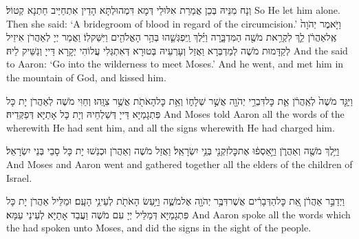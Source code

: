{וְנָח מִנֵּיהּ בְּכֵן אֲמַרַת אִלּוּלֵי דְּמָא דִּמְהוּלְתָּא הָדֵין אִתְחַיַּיב חַתְנָא קְטוֹל׃}
{So He let him alone. Then she said: ‘A bridegroom of blood in regard of the circumcision.’}{}
{וַיֹּ֤אמֶר יְהֹוָה֙ אֶֽל\maqqaf אַהֲרֹ֔ן לֵ֛ךְ לִקְרַ֥את מֹשֶׁ֖ה הַמִּדְבָּ֑רָה וַיֵּ֗לֶךְ וַֽיִּפְגְּשֵׁ֛הוּ בְּהַ֥ר הָאֱלֹהִ֖ים וַיִּשַּׁק\maqqaf לֽוֹ׃}
{וַאֲמַר יְיָ לְאַהֲרֹן אִיזֵיל לְקַדָּמוּת מֹשֶׁה לְמַדְבְּרָא וַאֲזַל וְעָרְעֵיהּ בְּטוּרָא דְּאִתְגְּלִי עֲלוֹהִי יְקָרָא דַּייָ וְנַשֵּׁיק לֵיהּ׃}
{And the \lord\space said to Aaron: ‘Go into the wilderness to meet Moses.’ And he went, and met him in the mountain of God, and kissed him.}{}

{וַיַּגֵּ֤ד מֹשֶׁה֙ לְאַֽהֲרֹ֔ן אֵ֛ת כׇּל\maqqaf דִּבְרֵ֥י יְהֹוָ֖ה אֲשֶׁ֣ר שְׁלָח֑וֹ וְאֵ֥ת כׇּל\maqqaf הָאֹתֹ֖ת אֲשֶׁ֥ר צִוָּֽהוּ׃}
{וְחַוִּי מֹשֶׁה לְאַהֲרֹן יָת כָּל פִּתְגָמַיָּא דַּייָ דְּשַׁלְחֵיהּ וְיָת כָּל אָתַיָּא דְּפַקְּדֵיהּ׃}
{And Moses told Aaron all the words of the \lord\space wherewith He had sent him, and all the signs wherewith He had charged him.}{}

{וַיֵּ֥לֶךְ מֹשֶׁ֖ה וְאַהֲרֹ֑ן וַיַּ֣אַסְפ֔וּ אֶת\maqqaf כׇּל\maqqaf זִקְנֵ֖י בְּנֵ֥י יִשְׂרָאֵֽל׃}
{וַאֲזַל מֹשֶׁה וְאַהֲרֹן וּכְנַשׁוּ יָת כָּל סָבֵי בְּנֵי יִשְׂרָאֵל׃}
{And Moses and Aaron went and gathered together all the elders of the children of Israel.}{}

{וַיְדַבֵּ֣ר אַהֲרֹ֔ן אֵ֚ת כׇּל\maqqaf הַדְּבָרִ֔ים אֲשֶׁר\maqqaf דִּבֶּ֥ר יְהֹוָ֖ה אֶל\maqqaf מֹשֶׁ֑ה וַיַּ֥עַשׂ הָאֹתֹ֖ת לְעֵינֵ֥י הָעָֽם׃}
{וּמַלֵּיל אַהֲרֹן יָת כָּל פִּתְגָמַיָּא דְּמַלֵּיל יְיָ עִם מֹשֶׁה וַעֲבַד אָתַיָּא לְעֵינֵי עַמָּא׃}
{And Aaron spoke all the words which the \lord\space had spoken unto Moses, and did the signs in the sight of the people.}{}

